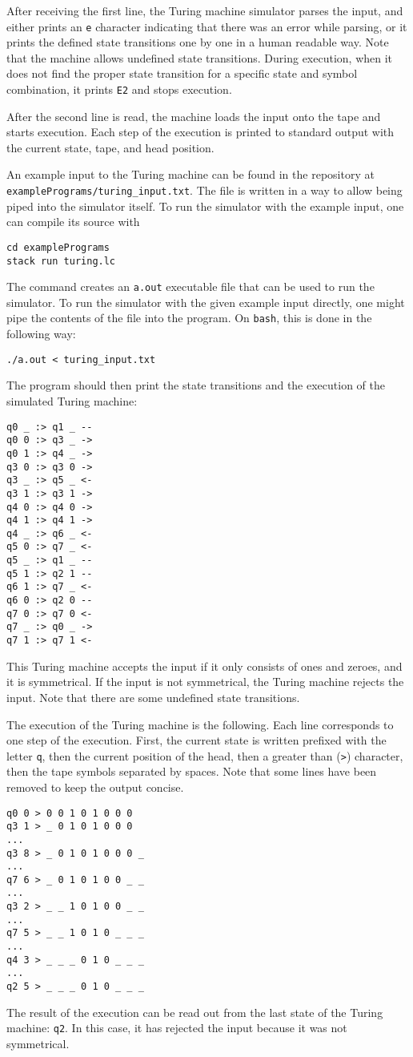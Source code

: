 \documentclass[12pt]{article}
\begin{document}
After receiving the first line, the Turing machine simulator parses the input,
and either prints an \verb$e$ character indicating that there was an error while
parsing, or it prints the defined state transitions one by one in a human
readable way. Note that the machine allows undefined state transitions. During
execution, when it does not find the proper state transition for a specific
state and symbol combination, it prints \verb$E2$ and stops execution.

After the second line is read, the machine loads the input onto the tape and
starts execution. Each step of the execution is printed to standard output with
the current state, tape, and head position.

\lstset{frame=lines}

An example input to the Turing machine can be found in the repository at\\
\verb$examplePrograms/turing_input.txt$. The file is written in a way to allow
being piped into the simulator itself. To run the simulator with the example
input, one can compile its source with
\begin{lstlisting}
cd examplePrograms
stack run turing.lc
\end{lstlisting}
The command creates an \verb$a.out$ executable file that can be used to run the
simulator. To run the simulator with the given example input directly, one might
pipe the contents of the file into the program. On \verb$bash$, this is done in
the following way:
\begin{lstlisting}
./a.out < turing_input.txt
\end{lstlisting}
The program should then print the state transitions and the execution of the 
simulated Turing machine:
\begin{lstlisting}
q0 _ :> q1 _ --
q0 0 :> q3 _ ->
q0 1 :> q4 _ ->
q3 0 :> q3 0 ->
q3 _ :> q5 _ <-
q3 1 :> q3 1 ->
q4 0 :> q4 0 ->
q4 1 :> q4 1 ->
q4 _ :> q6 _ <-
q5 0 :> q7 _ <-
q5 _ :> q1 _ --
q5 1 :> q2 1 --
q6 1 :> q7 _ <-
q6 0 :> q2 0 --
q7 0 :> q7 0 <-
q7 _ :> q0 _ ->
q7 1 :> q7 1 <-
\end{lstlisting}
This Turing machine accepts the input if it only consists of ones and zeroes,
and it is symmetrical. If the input is not symmetrical, the Turing machine
rejects the input. Note that there are some undefined state transitions.

The execution of the Turing machine is the following. Each line corresponds to
one step of the execution. First, the current state is written prefixed with the
letter \verb$q$, then the current position of the head, then a greater than
(\verb$>$) character, then the tape symbols separated by spaces. Note that some
lines have been removed to keep the output concise.
\begin{lstlisting}
q0 0 > 0 0 1 0 1 0 0 0 
q3 1 > _ 0 1 0 1 0 0 0 
...
q3 8 > _ 0 1 0 1 0 0 0 _ 
...
q7 6 > _ 0 1 0 1 0 0 _ _ 
...
q3 2 > _ _ 1 0 1 0 0 _ _ 
...
q7 5 > _ _ 1 0 1 0 _ _ _ 
...
q4 3 > _ _ _ 0 1 0 _ _ _ 
...
q2 5 > _ _ _ 0 1 0 _ _ _ 
\end{lstlisting}
The result of the execution can be read out from the last state of the Turing
machine: \verb$q2$. In this case, it has rejected the input because it was not
symmetrical.
\end{document}
